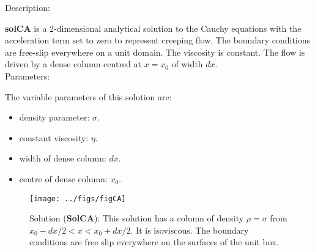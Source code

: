   {\large \fontB Description:}
  
  {\bf solCA} is a 2-dimensional analytical solution to the Cauchy equations with the acceleration term set to zero
  to represent creeping flow. The boundary conditions are free-slip everywhere on a unit domain. The viscosity is constant.
  The flow is driven by a dense column centred at $ x=x_0 $ of width $dx$.
  \\

 {\large \fontB Parameters:}
  
 The variable parameters of this solution are:
 \begin{itemize}
   \item{density parameter: $ \sigma $.}
   \item{constant viscosity: $\eta$.}
   \item{width of dense column: $dx$.}
   \item{centre of dense column: $x_0$.}

 \end{itemize}

  \begin{SCfigure}[][h]
    \texttt{[image: ../figs/figCA]}
    \caption[Short caption]{\label{figCA} 
      Solution ({\bf SolCA}):
      This solution has a column of density $\rho = \sigma$ from $x_0-dx/2 < x < x_0+dx/2$.
      It is isoviscous.
      The boundary conditions are free slip everywhere on the surfaces of the unit box.}
  \end{SCfigure} 
  


